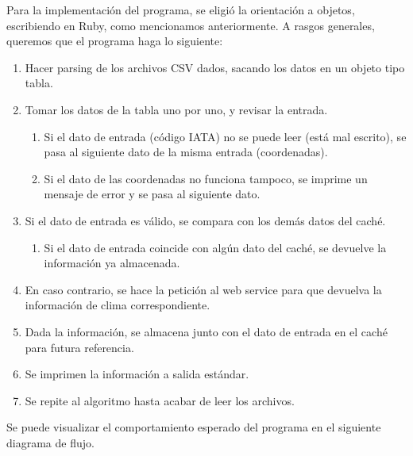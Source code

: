 \documentclass[11 pt]{article}
\theoremstyle{remark}
\begin{document}
	Para la implementación del programa, se eligió la orientación a objetos, escribiendo en Ruby, como mencionamos anteriormente. A rasgos generales, queremos que el programa haga lo siguiente:
		
	\begin{enumerate}
		\item Hacer parsing de los archivos CSV dados, sacando los datos en un objeto tipo tabla.
		
		\item Tomar los datos de la tabla uno por uno, y revisar la entrada.
		
		\begin{enumerate}
			\item Si el dato de entrada (código IATA) no se puede leer (está mal escrito), se pasa al siguiente dato de la misma entrada (coordenadas).
			
						\item Si el dato de las coordenadas no funciona tampoco, se imprime un mensaje de error y se pasa al siguiente dato.
				
		\end{enumerate}
			
		\item Si el dato de entrada es válido, se compara con los demás datos del caché.
			
		\begin{enumerate}
			\item Si el dato de entrada coincide con algún dato del caché, se devuelve la información ya almacenada.
				
		\end{enumerate}
				
		\item En caso contrario, se hace la petición al web service para que devuelva la información de clima correspondiente. 
			
		\item Dada la información, se almacena junto con el dato de entrada en el caché para futura referencia.
			
		\item Se imprimen la información a salida estándar.
			
		\item Se repite al algoritmo hasta acabar de leer los archivos.
			
	\end{enumerate}
		
	Se puede visualizar el comportamiento esperado del programa en el siguiente diagrama de flujo.
		
\end{document}
